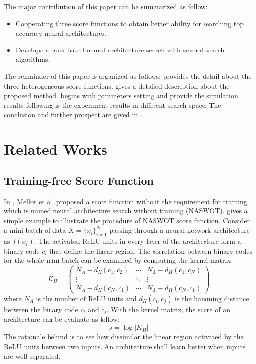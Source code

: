 \documentclass[sigconf]{acmart}
\begin{document}
    The major contribution of this paper can be summarized as follow:
    \begin{itemize}
        \item Cooperating three score functions to obtain better ability for searching top accuracy neural architectures. 
        \item Develope a rank-based neural architecture search with several search algorithms. 
    \end{itemize}

    The remainder of this paper is organized as follows:  provides the 
    detail about the three heterogeneous score functions.  gives a detailed 
    description about the proposed method.  begins with parameters setting and 
    provide the simulation results following is the experiment results in different search space. 
    The conclusion and further prospect are gived in .
    
    

    \section{Related Works}
    \label{sec:related_work}
    \subsection{Training-free Score Function}
    In \cite{https://doi.org/10.48550/arxiv.2006.04647}, Mellor et al. proposed a 
    score function without the requirement for training which is named neural 
    architecture search without training (NASWOT).  
	gives a simple example to illustrate the procedure of NASWOT score function. 
    Consider a mini-batch of data $X=\{x_i\}^N_{i=1}$ passing through a neural network 
    architecture as $f(x_i)$. The activated ReLU units in every layer of the architecture 
    form a binary code $c_i$ that define the linear region.
    The correlation between binary codes for the whole mini-batch can be examined 
    by computing the kernel matrix 
    \begin{equation}
        K_H=\begin{pmatrix}N_A-d_H(c_1,c_2)&\cdots&N_A-d_H(c_1,c_N)\\\vdots&\ddots&\vdots\\N_A-d_H(c_N,c_1)&\cdots&N_A-d_H(c_N,c_1)\end{pmatrix}
    \end{equation}
    where $N_A$ is the number of ReLU units and $d_H(c_i,c_j)$ is the hamming 
    distance between the binary code $c_i$ and $c_j$. 
    With the kernel matrix, the score of an architecture can be evaluate as 
    follow: 
    \begin{equation}
        s=\log\lvert K_H\rvert
    \end{equation}
    The rationale behind is to see how dissimilar the linear region activated by 
    the ReLU units between two inputs. An architecture shall learn better 
    when inputs are well separated.
\end{document}
